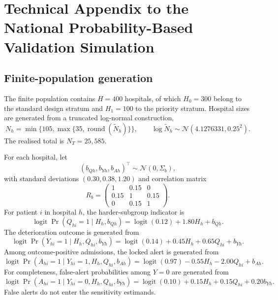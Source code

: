 \providecommand{\navdir}{national-AI-validation}

\section{Technical Appendix to the National Probability-Based Validation Simulation}
\label{app:sim-national-ai-validation}

\subsection{Finite-population generation}

The finite population contains \(H=400\) hospitals, of which
\(H_0=300\) belong to the standard design stratum and \(H_1=100\) to the
priority stratum. Hospital sizes are generated from a truncated log-normal
construction,
\[
  N_h
  =
  \min\{105,\max\{35,\operatorname{round}(\widetilde N_h)\}\},
  \qquad
  \log \widetilde N_h
  \sim
  \mathcal N(4.1276331,0.25^2).
\]
The realised total is \(N_T=25{,}585\).

For each hospital, let
\[
  (b_{Qh},b_{Yh},b_{Ah})^\top
  \sim
  \mathcal N(0,\Sigma_b),
\]
with standard deviations \((0.30,0.38,1.20)\) and correlation matrix
\[
  R_b
  =
  \begin{pmatrix}
    1 & 0.15 & 0 \\
    0.15 & 1 & 0.15 \\
    0 & 0.15 & 1
  \end{pmatrix}.
\]
For patient \(i\) in hospital \(h\), the harder-subgroup indicator is
\begin{equation}
  \operatorname{logit}\Pr(Q_{hi}=1\mid H_h,b_{Qh})
  =
  \operatorname{logit}(0.12)+1.80H_h+b_{Qh}.
  \label{eq:nav-app-q}
\end{equation}
The deterioration outcome is generated from
\begin{equation}
  \operatorname{logit}\Pr(Y_{hi}=1\mid H_h,Q_{hi},b_{Yh})
  =
  \operatorname{logit}(0.14)+0.45H_h+0.65Q_{hi}+b_{Yh}.
  \label{eq:nav-app-y}
\end{equation}
Among outcome-positive admissions, the locked alert is generated from
\begin{equation}
  \operatorname{logit}\Pr(A_{hi}=1\mid Y_{hi}=1,H_h,Q_{hi},b_{Ah})
  =
  \operatorname{logit}(0.97)-0.55H_h-2.00Q_{hi}+b_{Ah}.
  \label{eq:nav-app-a}
\end{equation}
For completeness, false-alert probabilities among \(Y=0\) are generated from
\[
  \operatorname{logit}\Pr(A_{hi}=1\mid Y_{hi}=0,H_h,Q_{hi},b_{Yh})
  =
  \operatorname{logit}(0.10)+0.15H_h+0.15Q_{hi}+0.20b_{Yh}.
\]
False alerts do not enter the sensitivity estimands.

